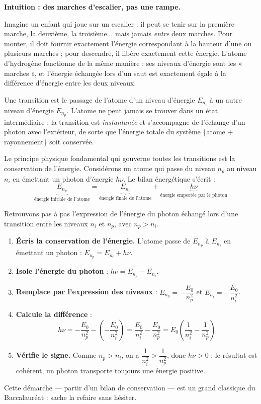 \documentclass[11pt]{article}
\newcommand{\cle}[1]{{\popxbold\color{popdark}#1}}
\begin{document}
\textbf{Intuition : des marches d'escalier, pas une rampe.}

Imagine un enfant qui joue sur un escalier : il peut se tenir sur la première marche, la deuxième, la troisième... mais jamais \emph{entre} deux marches. Pour monter, il doit fournir exactement l'énergie correspondant à la hauteur d'une ou plusieurs marches ; pour descendre, il libère exactement cette énergie. L'atome d'hydrogène fonctionne de la même manière : ses niveaux d'énergie sont les « marches », et l'énergie échangée lors d'un saut est exactement égale à la différence d'énergie entre les deux niveaux.

\begin{definition}
Une \cle{transition} est le passage de l'atome d'un niveau d'énergie $E_{n_i}$ à un autre niveau d'énergie $E_{n_p}$. L'atome ne peut jamais se trouver dans un état intermédiaire : la transition est \emph{instantanée} et s'accompagne de l'échange d'un photon avec l'extérieur, de sorte que l'énergie totale du système \{atome + rayonnement\} soit conservée.
\end{definition}

Le principe physique fondamental qui gouverne toutes les transitions est la \cle{conservation de l'énergie}. Considérons un atome qui passe du niveau $n_p$ au niveau $n_i$ en émettant un photon d'énergie $h\nu$. Le bilan énergétique s'écrit :
\[ \underbrace{E_{n_p}}_{\text{énergie initiale de l'atome}} = \underbrace{E_{n_i}}_{\text{énergie finale de l'atome}} + \underbrace{h\nu}_{\text{énergie emportée par le photon}} \]

\begin{experience}
Retrouvons pas à pas l'expression de l'énergie du photon échangé lors d'une transition entre les niveaux $n_i$ et $n_p$, avec $n_p > n_i$.
\begin{enumerate}
\item \textbf{Écris la conservation de l'énergie.} L'atome passe de $E_{n_p}$ à $E_{n_i}$ en émettant un photon : $E_{n_p} = E_{n_i} + h\nu$.
\item \textbf{Isole l'énergie du photon} : $h\nu = E_{n_p} - E_{n_i}$.
\item \textbf{Remplace par l'expression des niveaux} : $E_{n_p} = -\dfrac{E_0}{n_p^2}$ et $E_{n_i} = -\dfrac{E_0}{n_i^2}$.
\item \textbf{Calcule la différence} :
\[ h\nu = -\frac{E_0}{n_p^2} - \left(-\frac{E_0}{n_i^2}\right) = \frac{E_0}{n_i^2} - \frac{E_0}{n_p^2} = E_0\left(\frac{1}{n_i^2} - \frac{1}{n_p^2}\right) \]
\item \textbf{Vérifie le signe.} Comme $n_p > n_i$, on a $\dfrac{1}{n_i^2} > \dfrac{1}{n_p^2}$, donc $h\nu > 0$ : le résultat est cohérent, un photon transporte toujours une énergie positive.
\end{enumerate}
Cette démarche — partir d'un bilan de conservation — est un grand classique du Baccalauréat : sache la refaire sans hésiter.
\end{experience}
\end{document}

